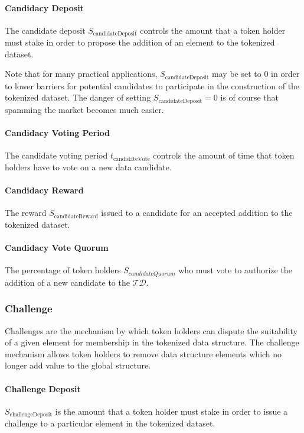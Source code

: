 \documentclass{llncs}
\begin{document}
\paragraph{Candidacy Deposit}
The candidate deposit $S_\text{candidateDeposit}$ controls the amount that a token holder must stake in order to propose the addition of an element to the tokenized dataset.

Note that for many practical applications, $S_\text{candidateDeposit}$ may be set to 0 in order to lower barriers for potential candidates to participate in the construction of the tokenized dataset. The danger of setting $S_\text{candidateDeposit} = 0$ is of course that spamming the market becomes much easier.


\paragraph{Candidacy Voting Period}
The candidate voting period $t_\text{candidateVote}$ controls the amount of time that token holders have to vote on a new data candidate.

\paragraph{Candidacy Reward}
The reward $S_\text{candidateReward}$ issued to a candidate for an accepted addition to the tokenized dataset.

\paragraph{Candidacy Vote Quorum}
The percentage of token holders $S_{candidateQuorum}$ who must vote to authorize the addition of a new candidate to the $\mathcal{TD}$.

\subsubsection{Challenge}
Challenges are the mechanism by which token holders can dispute the suitability of a given element for membership in the tokenized data structure. The challenge mechanism allows token holders to remove data structure elements which no longer add value to the global structure.

\paragraph{Challenge Deposit}
$S_\text{challengeDeposit}$ is the amount that a token holder must stake in order to issue a challenge to a particular element in the tokenized dataset.
\end{document}
